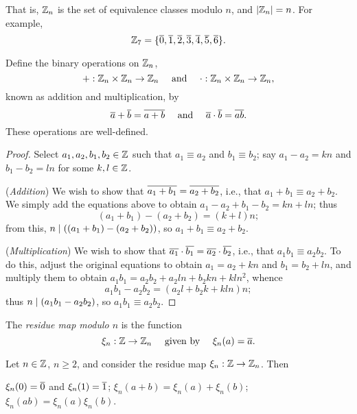 \documentclass{amsart}
\newcommand{\res}{\xi}
\begin{document}
That is, $\mathbb{Z}_n$ is the set of equivalence classes modulo $n$, and $|\mathbb{Z}_n| = n$.
For example,
\[ \mathbb{Z}_{7} = \{ \overline{0}, \overline{1}, \overline{2}, \overline{3},
        \overline{4}, \overline{5}, \overline{6} \} . \]

\begin{Prop}
Define the binary operations on $\mathbb{Z}_n$,
\[ + : \mathbb{Z}_n \times \mathbb{Z}_n \to \mathbb{Z}_n \quad \text{ and } \quad \cdot : \mathbb{Z}_n \times \mathbb{Z}_n \to \mathbb{Z}_n , \]
known as addition and multiplication, by
\[ \overline{a} + \overline{b} = \overline{a+b}
        \quad \text{ and } \quad \overline{a}\cdot\overline{b} = \overline{ab} . \]
These operations are well-defined.
\end{Prop}

\begin{proof}
Select $a_{1},a_{2},b_{1},b_{2} \in \mathbb{Z}$ such that $a_{1} \equiv
a_{2}$ and $b_{1} \equiv b_{2}$; say $a_{1} - a_{2} = kn$ and $b_{1}
- b_{2} = ln$ for some $k,l \in \mathbb{Z}$.

({\em Addition})
We wish to show that $\overline{a_{1}+b_{1}} = \overline{a_{2} + b_{2}}$, i.e.,
that $a_{1} + b_{1} \equiv a_{2} + b_{2}$.
We simply add the equations above to obtain
$a_{1} - a_{2} + b_{1} - b_{2} = kn + ln$;
thus
\[ (a_{1} + b_{1}) - (a_{2} + b_{2}) = (k+l)n ; \]
from this, $n \mid ((a_{1}+b_{1})-(a_{2}+b_{2}))$,
so $a_{1}+b_{1} \equiv a_{2} + b_{2}$.

({\em Multiplication})
We wish to show
that $\overline{a_{1}}\cdot\overline{b_{1}} = \overline{a_{2}} \cdot \overline{b_{2}}$, i.e.,
that $a_{1}b_{1} \equiv a_{2}b_{2}$.
To do this, adjust the original equations to obtain
$a_{1} = a_{2} + kn$ and $b_{1} = b_{2} + ln$,
and multiply them to obtain
$a_{1}b_{1} = a_{2}b_{2} + a_{2}ln + b_{2}kn + kln^{2}$,
whence
\[ a_{1}b_{1} - a_{2}b_{2} = (a_{2}l + b_{2}k + kln)n ; \]
thus $n \mid (a_{1}b_{1} - a_{2}b_{2})$,
so $a_{1}b_{1} \equiv a_{2}b_{2}$.
\end{proof}

\begin{Def}
The {\em residue map modulo $n$} is the function
\[ \res_n : \bZ \to \bZ_n \quad \text{ given by } \quad \res_n(a) = \BAR{a} . \]
\end{Def}

\begin{Prop}
Let $n \in \mathbb{Z}$, $n \ge 2$, and consider the residue map $\res_n : \bZ \to \bZ_n$.
Then
\begin{itemize}
 $\res_n(0) = \BAR{0}$ and $\res_n(1) = \BAR{1}$;
 $\res_n(a+b) = \res_n(a) + \res_n(b)$;
 $\res_n(ab) = \res_n(a) \res_n(b)$.
\end{itemize}
\end{Prop}
\end{document}
